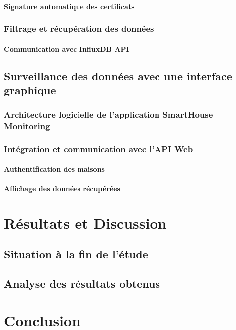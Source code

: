 \documentclass[10pt, a4paper]{report}
\begin{document}
	\subsubsection{Signature automatique des certificats}
	\subsection{Filtrage et récupération des données}
	\subsubsection{Communication avec InfluxDB API}
	
	\section{Surveillance des données avec une interface graphique}
	\subsection{Architecture logicielle de l'application SmartHouse Monitoring}
	\subsection{Intégration et communication avec l'API Web}
	\subsubsection{Authentification des maisons}
	\subsubsection{Affichage des données récupérées}
	
	\chapter{Résultats et Discussion}
	\section{Situation à la fin de l’étude}
	\section{Analyse des résultats obtenus}
	
	\chapter{Conclusion}
\end{document}
